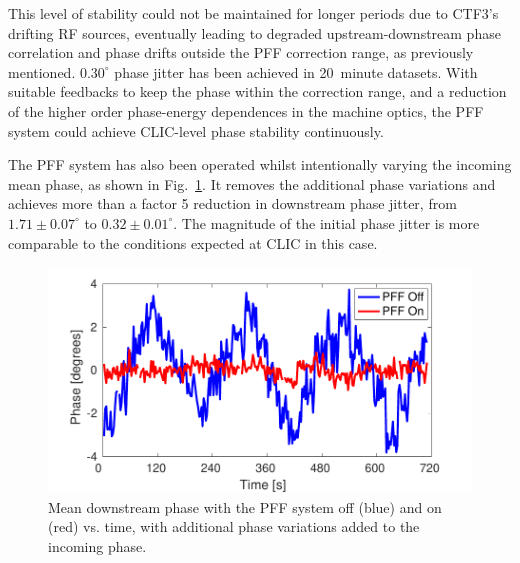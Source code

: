 \documentclass[%
 reprint,
superscriptaddress,
 amsmath,amssymb,
 prl,
]{revtex4-1}
\begin{document}
This level of stability could not be maintained for longer periods due to 
CTF3's drifting RF sources, eventually leading to degraded 
upstream-downstream phase correlation and phase drifts outside the PFF 
correction range, as previously mentioned. \(0.30^\circ\) phase jitter has been 
achieved in 20~minute datasets. With suitable feedbacks to keep the phase 
within the correction range, and a reduction of the higher order phase-energy 
dependences in the machine optics, the PFF system could achieve CLIC-level 
phase stability continuously.

The PFF system has also been operated 
whilst intentionally varying the incoming mean phase, as shown in 
Fig.~\ref{fig:wiggle}. It removes the additional phase variations 
and achieves more than a factor 5 reduction in downstream phase jitter, from 
\(1.71\pm0.07^\circ\) to \(0.32\pm0.01^\circ\). The magnitude of 
the initial phase jitter is more comparable to the conditions expected at CLIC 
in this case.

\begin{figure}
	\includegraphics[width=\columnwidth]{figs/wiggle}
	\caption{\label{fig:wiggle}Mean downstream phase with the PFF system off 
		(blue) and on (red) vs. time, with additional phase variations added to 
		the 
		incoming phase.}
\end{figure}

%
%
%
\end{document}

